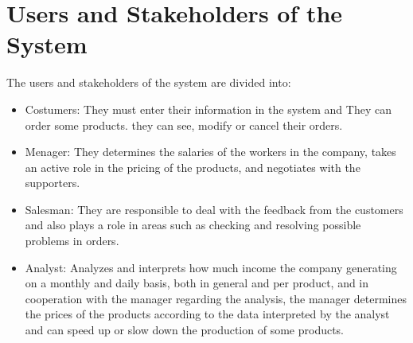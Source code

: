 \section{Users and Stakeholders of the System}
The users and stakeholders of the system are divided into:
\begin{itemize}
	\item Costumers: They must enter their information in the system and They can order some products. they can see, modify or cancel their orders.
	\item Menager: They determines the salaries of the workers in the company, takes an active role in the pricing of the products, and negotiates with the supporters.
	\item Salesman: They are responsible to deal with the feedback from the customers and also plays a role in areas such as checking and resolving possible problems in orders.
	\item Analyst: Analyzes and interprets how much income the company generating on a monthly and daily basis, both in general and per product, and in cooperation with the manager regarding the analysis, the manager determines the prices of the products according to the data interpreted by the analyst and can speed up or slow down the production of some products.
\end{itemize}